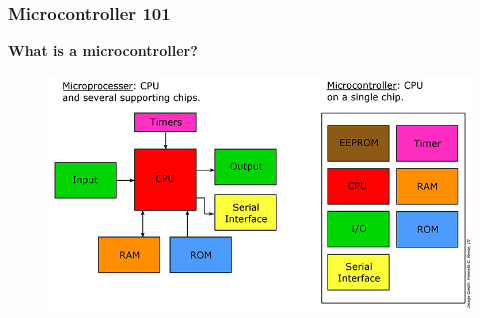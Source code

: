\documentclass[t]{beamer}
\begin{document}

\begin{frame}[t]
\frametitle{Microcontroller 101}

\textbf{What is a microcontroller?} 

\begin{figure}
	\includegraphics[scale=0.4]{microProcessorVsController.jpg}
\end{figure}

\end{frame}

\end{document}
